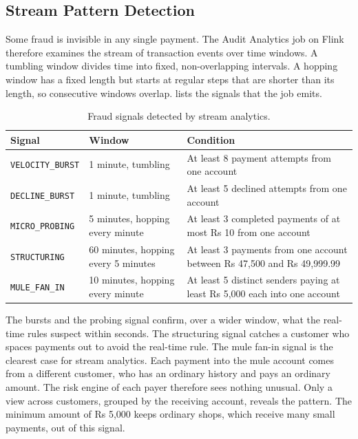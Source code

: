 \documentclass[11pt,a4paper]{article}
\newcommand{\code}[1]{\texttt{#1}}
\begin{document}
\subsection{Stream Pattern Detection}
\label{sec:patterns}

Some fraud is invisible in any single payment. The Audit Analytics job on Flink therefore examines the stream of transaction events over time windows. A tumbling window divides time into fixed, non-overlapping intervals. A hopping window has a fixed length but starts at regular steps that are shorter than its length, so consecutive windows overlap.  lists the signals that the job emits.

\begin{table}[H]\centering\small
\caption{Fraud signals detected by stream analytics.}\label{tab:patterns}
\begin{tabularx}{\linewidth}{@{}L{3.2cm}L{3.6cm}Y@{}}
\toprule
Signal & Window & Condition \\
\midrule
\code{VELOCITY\_BURST} & 1 minute, tumbling & At least 8 payment attempts from one account \\
\code{DECLINE\_BURST} & 1 minute, tumbling & At least 5 declined attempts from one account \\
\code{MICRO\_PROBING} & 5 minutes, hopping every minute & At least 3 completed payments of at most Rs 10 from one account \\
\code{STRUCTURING} & 60 minutes, hopping every 5 minutes & At least 3 payments from one account between Rs 47,500 and Rs 49,999.99 \\
\code{MULE\_FAN\_IN} & 10 minutes, hopping every minute & At least 5 distinct senders paying at least Rs 5,000 each into one account \\
\bottomrule
\end{tabularx}
\end{table}

The bursts and the probing signal confirm, over a wider window, what the real-time rules suspect within seconds. The structuring signal catches a customer who spaces payments out to avoid the real-time rule. The mule fan-in signal is the clearest case for stream analytics. Each payment into the mule account comes from a different customer, who has an ordinary history and pays an ordinary amount. The risk engine of each payer therefore sees nothing unusual. Only a view across customers, grouped by the receiving account, reveals the pattern. The minimum amount of Rs 5,000 keeps ordinary shops, which receive many small payments, out of this signal.
\end{document}
